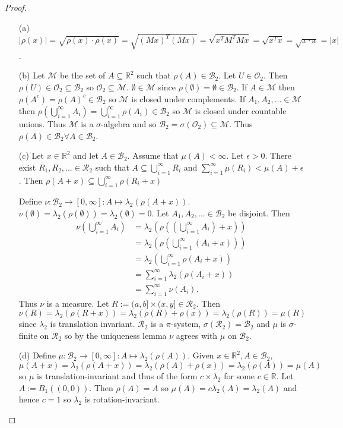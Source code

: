 \documentclass{article}
\begin{document}
\begin{proof}
\begin{enumerate}
    \item[(a)] $|\rho(x)|=\sqrt{\rho(x)\cdot\rho(x)}=\sqrt{(Mx)^T(Mx)}=\sqrt{x^TM^TMx}=\sqrt{x^Tx}=\sqrt{x\cdot x}=|x|$.
    \item[(b)] Let $\mathcal{M}$ be the set of $A\subseteq\mathbb{R}^2$ such that $\rho(A)\in\mathcal{B}_2$. Let $U\in\mathcal{O}_2$. Then $\rho(U)\in\mathcal{O}_2\subseteq\mathcal{B}_2$ so $\mathcal{O}_2\subseteq\mathcal{M}$. $\emptyset\in\mathcal{M}$ since $\rho(\emptyset)=\emptyset\in\mathcal{B}_2$. If $A\in\mathcal{M}$ then $\rho(A^c)=\rho(A)^c\in\mathcal{B}_2$ so $\mathcal{M}$ is closed under complements. If $A_1,A_2,...\in\mathcal{M}$ then $\rho(\bigcup_{i=1}^\infty A_i)=\bigcup_{i=1}^\infty\rho(A_i)\in\mathcal{B}_2$ so $\mathcal{M}$ is closed under countable unions. Thus $\mathcal{M}$ is a $\sigma$-algebra and so $\mathcal{B}_2=\sigma(\mathcal{O}_2)\subseteq\mathcal{M}$. Thus $\rho(A)\in\mathcal{B}_2\forall A\in\mathcal{B}_2$.
    \item[(c)] Let $x\in\mathbb{R}^2$ and let $A\in\mathcal{B}_2$. Assume that $\mu(A)<\infty$. Let $\epsilon>0$. There exist $R_1,R_2,...\in\mathcal{R}_2$ such that $A\subseteq\bigcup_{i=1}^\infty R_i$ and $\sum_{i=1}^\infty\mu(R_i)<\mu(A)+\epsilon$. Then $\rho(A+x)\subseteq\bigcup_{i=1}^\infty\rho(R_i+x)$

    Define $\nu:\mathcal{B}_2\to[0,\infty]:A\mapsto\lambda_2(\rho(A+x))$. $\nu(\emptyset)=\lambda_2(\rho(\emptyset))=\lambda_2(\emptyset)=0$. Let $A_1,A_2,...\in\mathcal{B}_2$ be disjoint. Then \begin{align*}      
    \nu(\bigcup_{i=1}^\infty A_i)&=\lambda_2(\rho((\bigcup_{i=1}^\infty A_i) +x))\\&=\lambda_2(\rho(\bigcup_{i=1}^\infty(A_i+x)))\\&=\lambda_2(\bigcup_{i=1}^\infty\rho(A_i+x))\\&=\sum_{i=1}^\infty\lambda_2(\rho(A_i+x))\\&=\sum_{i=1}^\infty\nu(A_i).
    \end{align*} Thus $\nu$ is a measure. Let $R:=(a,b]\times(x,y]\in\mathcal{R}_2$. Then $\nu(R)=\lambda_2(\rho(R+x))=\lambda_2(\rho(R)+\rho(x))=\lambda_2(\rho(R))=\mu(R)$ since $\lambda_2$ is translation invariant. $\mathcal{R}_2$ is a $\pi$-system, $\sigma(\mathcal{R}_2)=\mathcal{B}_2$ and $\mu$ is $\sigma$-finite on $\mathcal{R}_2$ so by the uniqueness lemma $\nu$ agrees with $\mu$ on $\mathcal{B}_2$.
    \item[(d)] Define $\mu:\mathcal{B}_2\to[0,\infty]:A\mapsto\lambda_2(\rho(A))$. Given $x\in\mathbb{R}^2,A\in\mathcal{B}_2$, $\mu(A+x)=\lambda_2(\rho(A+x))=\lambda_2(\rho(A)+\rho(x))=\lambda_2(\rho(A))=\mu(A)$ so $\mu$ is translation-invariant and thus of the form $c\times\lambda_2$ for some $c\in\mathbb{R}$. Let $A:=B_1((0,0))$. Then $\rho(A)=A$ so $\mu(A)=c\lambda_2(A)=\lambda_2(A)$ and hence $c=1$ so $\lambda_2$ is rotation-invariant.
\end{enumerate}
\end{proof}
\end{document}
